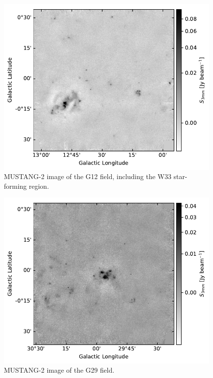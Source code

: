 \documentclass[twocolumn]{aastex62}
\newcommand{\MUSTANG}{MUSTANG-2\xspace}
\begin{document}
\begin{figure}[htp]
\includegraphics[width=17cm]{figures/G12_overview.pdf}
\caption{\MUSTANG image of the G12 field, including the W33 star-forming region.}
\label{fig:g12overview}
\end{figure}

\begin{figure}[htp]
\includegraphics[width=17cm]{figures/G29_overview.pdf}
\caption{\MUSTANG image of the G29 field.}
\label{fig:g29overview}
\end{figure}
\end{document}
